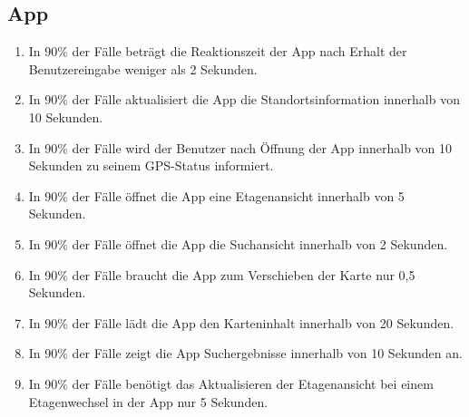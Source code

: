 \subsection{App}

\begin{enumerate}
    \item In 90\% der Fälle beträgt die Reaktionszeit der App nach Erhalt der Benutzereingabe weniger als 2 Sekunden.
    \item In 90\% der Fälle aktualisiert die App die Standortsinformation innerhalb von 10 Sekunden.
    \item In 90\% der Fälle wird der Benutzer nach Öffnung der App innerhalb von 10 Sekunden zu seinem GPS-Status informiert.
    \item In 90\% der Fälle öffnet die App eine Etagenansicht innerhalb von 5 Sekunden.
    \item In 90\% der Fälle öffnet die App die Suchansicht innerhalb von 2 Sekunden.
    \item In 90\% der Fälle braucht die App zum Verschieben der Karte nur 0,5 Sekunden.
    \item In 90\% der Fälle lädt die App den Karteninhalt innerhalb von 20 Sekunden.
    \item In 90\% der Fälle zeigt die App Suchergebnisse innerhalb von 10 Sekunden an.
    \item In 90\% der Fälle benötigt das Aktualisieren der Etagenansicht bei einem Etagenwechsel in der App nur 5 Sekunden.
\end{enumerate}
